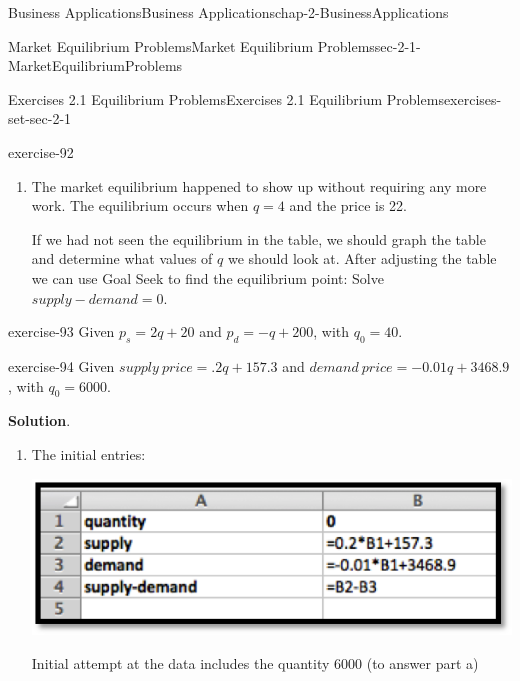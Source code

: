 \documentclass[oneside,10pt,]{book}
\numberwithin{equation}{section}
\begin{document}
\begin{chapterptx}{Business Applications}{}{Business Applications}{}{}{chap-2-BusinessApplications}
\begin{sectionptx}{Market Equilibrium Problems}{}{Market Equilibrium Problems}{}{}{sec-2-1-MarketEquilibriumProblems}
\begin{exercises-subsection-numberless}{Exercises 2.1 Equilibrium Problems}{}{Exercises 2.1 Equilibrium Problems}{}{}{exercises-set-sec-2-1}
\begin{exercisegroup}
\begin{divisionexerciseeg}{1}{}{}{exercise-92}
\begin{enumerate}[label=(\alph*)]
\item\hypertarget{li-167}{}\hypertarget{p-592}{}%
The market equilibrium happened to show up without requiring any more work. The equilibrium occurs when \(q = 4\) and the price is \textdollar{}22.%
\par
\hypertarget{p-593}{}%
If we had not seen the equilibrium in the table, we should graph the table and determine what values of \(q\) we should look at. After adjusting the table we can use Goal Seek to find the equilibrium point: Solve\(supply-demand=0.\)%
\end{enumerate}
\end{divisionexerciseeg}%
\begin{divisionexerciseeg}{2}{}{}{exercise-93}%
\hypertarget{p-594}{}%
Given \(p_s=2 q+20\) and \(p_d=- q+200\), with \(q_0=40\).%
\end{divisionexerciseeg}%
\begin{divisionexerciseeg}{3}{}{}{exercise-94}%
\hypertarget{p-595}{}%
Given \(supply\ price=.2 q+157.3\) and \(demand\ price=-0.01 q+3468.9\), with \(q_0=6000\).%
\par\smallskip%
\noindent\textbf{Solution}.\hypertarget{solution-45}{}\quad%
\leavevmode%
\begin{enumerate}[label=(\alph*)]
\item\hypertarget{li-168}{}\hypertarget{p-596}{}%
The initial entries: \leavevmode%
\begin{sidebyside}{1}{0.2}{0.2}{0}%
\begin{sbspanel}{0.6}%
\includegraphics[width=1\linewidth]{images/sec2-1-sol3a.png}
\end{sbspanel}%
\end{sidebyside}%
 Initial attempt at the data includes the quantity 6000 (to answer part a) \begin{sidebyside}{1}{0.1}{0.1}{0}%
\begin{sbspanel}{0.8}%

\end{sbspanel}
\end{sidebyside}
\end{enumerate}
\end{divisionexerciseeg}
\end{exercisegroup}
\end{exercises-subsection-numberless}
\end{sectionptx}
\end{chapterptx}
\end{document}

